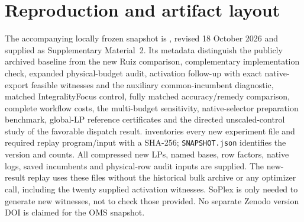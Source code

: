 \documentclass[11pt]{article}
\begin{document}
\section{Reproduction and artifact layout}
The accompanying locally frozen snapshot is , revised
18 October 2026 and supplied as Supplementary Material~2. Its metadata distinguish
the publicly archived  baseline from the new Ruiz comparison,
complementary implementation check, expanded physical-budget audit, activation
follow-up with exact native-export feasible witnesses and the auxiliary
common-incumbent diagnostic, matched IntegralityFocus control, fully matched
accuracy/remedy comparison, complete workflow costs, the multi-budget sensitivity,
native-selector preparation benchmark, global-LP reference certificates and the
directed unscaled-control study of the favorable dispatch result.
 inventories every new experiment
file and required replay program/input with a SHA-256; \texttt{SNAPSHOT.json} identifies
the version and counts. All compressed new LPs, named bases, row factors, native logs,
saved incumbents and physical-row audit inputs are supplied. The new-result replay uses
these files without the historical bulk archive or any optimizer call, including
the twenty supplied activation witnesses. SoPlex is only needed to generate new
witnesses, not to check those provided. No separate
Zenodo version DOI is claimed for the OMS snapshot.
\end{document}
